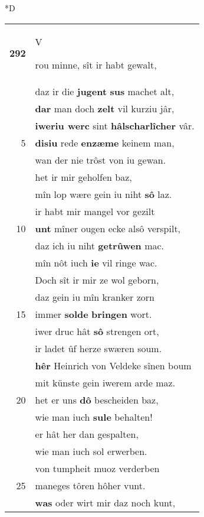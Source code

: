 \documentclass[8pt,a4paper,notitlepage]{article}
\begin{document}
\begin{table}[ht]
\begin{minipage}[t]{0.5\linewidth}
\small
\begin{center}*D
\end{center}
\begin{tabular}{rl}
\textbf{292} & \begin{large}V\end{large}rou minne, sît ir habt gewalt,\\ 
 & daz ir die \textbf{jugent} \textbf{sus} machet alt,\\ 
 & \textbf{dar} man doch \textbf{zelt} vil kurziu jâr,\\ 
 & \textbf{iweriu werc} sint \textbf{hâlscharlîcher} vâr.\\ 
5 & \textbf{disiu} rede \textbf{en}\textbf{zæme} keinem man,\\ 
 & wan der nie trôst von iu gewan.\\ 
 & het ir mir geholfen baz,\\ 
 & mîn lop wære gein iu niht \textbf{sô} laz.\\ 
 & ir habt mir mangel vor gezilt\\ 
10 & \textbf{unt} mîner ougen ecke alsô verspilt,\\ 
 & daz ich iu niht \textbf{getrûwen} mac.\\ 
 & mîn nôt iuch \textbf{ie} vil ringe wac.\\ 
 & Doch sît ir mir ze wol geborn,\\ 
 & daz gein iu mîn kranker zorn\\ 
15 & immer \textbf{solde} \textbf{bringen} wort.\\ 
 & iwer druc hât \textbf{sô} strengen ort,\\ 
 & ir ladet ûf herze swæren soum.\\ 
 & \textbf{hêr} Heinrich von Veldeke sînen boum\\ 
 & mit künste gein iwerem arde maz.\\ 
20 & het er uns \textbf{dô} bescheiden baz,\\ 
 & wie man iuch \textbf{sule} behalten!\\ 
 & er hât her dan gespalten,\\ 
 & wie man iuch sol erwerben.\\ 
 & von tumpheit muoz verderben\\ 
25 & maneges tôren hôher vunt.\\ 
 & \textbf{was} oder wirt mir daz noch kunt,\\ 

\end{tabular}
\end{minipage}
\end{table}
\end{document}
